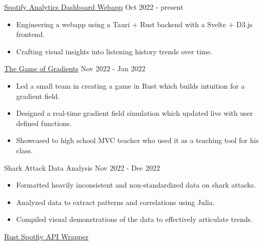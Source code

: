 \documentclass[9pt]{resume}
\begin{document}

    \begin{experiencelist}
        \experience 
            {\href{https://github.com/TheSharkhead2/Spotify_Analytics_Dashboard}{Spotify Analytics Dashboard Webapp}}
            {Oct 2022 - present}
            {}
            {\begin{itemize}[noitemsep, topsep=1pt]
                \item Engineering a webapp using a Tauri + Rust backend with a Svelte + D3.js frontend. 
                \item Crafting visual insights into listening history trends over time.
            \end{itemize}}
        \experience 
            {\href{https://github.com/TheSharkhead2/The_Game_of_Gradients}{The Game of Gradients}}
            {Nov 2022 - Jan 2022}
            {}
            {\begin{itemize}[noitemsep, topsep=1pt] 
                \item Led a small team in creating a game in Rust which builds intuition for a gradient field.
                \item Designed a real-time gradient field simulation which updated live with user defined functions. 
                \item Showcased to high school MVC teacher who used it as a teaching tool for his class.
            \end{itemize}}
        \experience 
            {Shark Attack Data Analysis}
            {Nov 2022 - Dec 2022}
            {}
            {\begin{itemize}[noitemsep, topsep=1pt]
                \item Formatted heavily inconsistent and non-standardized data on shark attacks.
                \item Analyzed data to extract patterns and correlations using Julia. 
                \item Compiled visual demonstrations of the data to effectively articulate trends. 
            \end{itemize}}
        \experience
            {\href{https://github.com/TheSharkhead2/spotify.rs}{Rust Spotfiy API Wrapper}}

\end{experiencelist}
\end{document}
